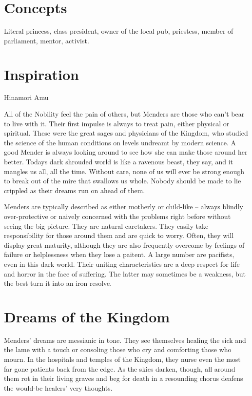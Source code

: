 \section*{Concepts}

Literal princess, class president, owner of the local pub, priestess, member of parliament, mentor, activist. 

\section*{Inspiration}
Hinamori Amu

\newpage{}
All of the Nobility feel the pain of others, but Menders are those who can't bear to live with it. Their first impulse is always to treat pain, either physical or spiritual. These were the great sages and physicians of the Kingdom, who studied the science of the human conditions on levels undreamt by modern science. A good Mender is always looking around to see how she can make those around her better. Todays dark shrouded world is like a ravenous beast, they say, and it mangles us all, all the time. Without care, none of us will ever be strong enough to break out of the mire that swallows us whole. Nobody should be made to lie crippled as their dreams run on ahead of them.

Menders are typically described as either motherly or child-like – always blindly over-protective or naively concerned with the problems right before without seeing the big picture. They are natural caretakers. They easily take responsibility for those around them and are quick to worry. Often, they will display great maturity, although they are also frequently overcome by feelings of failure or helplessness when they lose a paitent. A large number are pacifists, even in this dark world. Their uniting characteristics are a deep respect for life and horror in the face of suffering. The latter may sometimes be a weakness, but the best turn it into an iron resolve. 

\section*{Dreams of the Kingdom}

Menders' dreams are messianic in tone. They see themselves healing the sick and the lame with a touch or consoling those who cry and comforting those who mourn. In the hospitals and temples of the Kingdom, they nurse even the most far gone patients back from the edge. As the skies darken, though, all around them rot in their living graves and beg for death in a resounding chorus deafens the would-be healers' very thoughts. 

